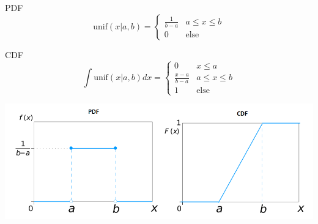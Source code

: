PDF
\[
\text{unif}(x| a,b) = \begin{cases}
	\frac{1}{b-a} & a \le x \le b \\
	0 & \text{else}
\end{cases}
\]

CDF
\[
\int\text{unif}(x| a,b)dx = \begin{cases}
	0 & x \le a \\
	\frac{x-a}{b-a} & a \le x \le b \\
	1 & \text{else}
\end{cases}
\]
\begin{center}
	\includegraphics[width=0.8\columnwidth]{Images/unif}
\end{center}